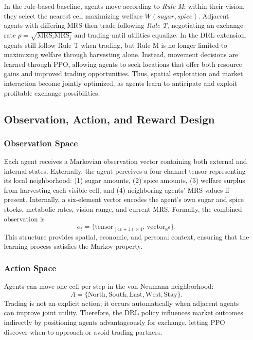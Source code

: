 \documentclass[pdflatex,sn-mathphys-num]{sn-jnl}%
\theoremstyle{thmstyleone}%
\theoremstyle{thmstyletwo}%
\theoremstyle{thmstylethree}%
\begin{document}
In the rule-based baseline, agents move according to \textit{Rule M}: within their vision, they select the nearest cell maximizing welfare \(W(sugar, spice)\).  
Adjacent agents with differing MRS then trade following \textit{Rule T}, negotiating an exchange rate \(p=\sqrt{\text{MRS}_i\text{MRS}_j}\) and trading until utilities equalize.
In the DRL extension, agents still follow Rule T when trading, but Rule M is no longer limited to maximizing welfare through harvesting alone. Instead, movement decisions are learned through PPO, allowing agents to seek locations that offer both resource gains and improved trading opportunities. Thus, spatial exploration and market interaction become jointly optimized, as agents learn to anticipate and exploit profitable exchange possibilities.

\subsection{Observation, Action, and Reward Design}

\subsubsection{Observation Space}
Each agent receives a Markovian observation vector containing both external and internal states.  
Externally, the agent perceives a four-channel tensor representing its local neighborhood:  
(1) sugar amounts, (2) spice amounts, (3) welfare surplus from harvesting each visible cell, and (4) neighboring agents’ MRS values if present.  
Internally, a six-element vector encodes the agent’s own sugar and spice stocks, metabolic rates, vision range, and current MRS.  
Formally, the combined observation is
\[
o_t=\{\text{tensor}_{(4v+1)\times4},\, \text{vector}_{\mathbb{R}^6}\}.
\]
This structure provides spatial, economic, and personal context, ensuring that the learning process satisfies the Markov property.

\subsubsection{Action Space}
Agents can move one cell per step in the von Neumann neighborhood:
\[
A=\{\text{North},\text{South},\text{East},\text{West},\text{Stay}\}.
\]
Trading is not an explicit action; it occurs automatically when adjacent agents can improve joint utility.  
Therefore, the DRL policy influences market outcomes indirectly by positioning agents advantageously for exchange, letting PPO discover when to approach or avoid trading partners.
\end{document}
